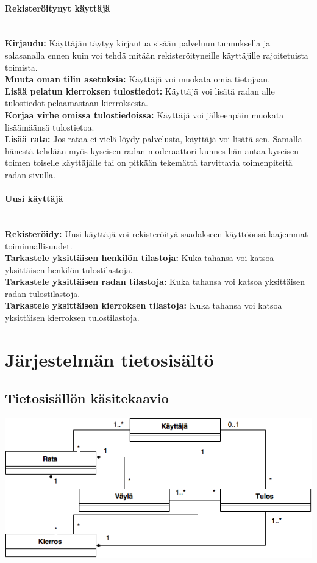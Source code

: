\documentclass[10pt,a4paper]{article}
\begin{document}
\paragraph{Rekisteröitynyt käyttäjä} \hspace{0pt}
\\\textbf{Kirjaudu:} Käyttäjän täytyy kirjautua sisään palveluun tunnuksella ja salasanalla ennen kuin voi tehdä mitään rekisteröityneille käyttäjille rajoitetuista toimista.
\\\textbf{Muuta oman tilin asetuksia:} Käyttäjä voi muokata omia tietojaan.
\\\textbf{Lisää pelatun kierroksen tulostiedot:} Käyttäjä voi lisätä radan alle tulostiedot pelaamastaan kierroksesta.
\\\textbf{Korjaa virhe omissa tulostiedoissa:} Käyttäjä voi jälkeenpäin muokata lisäämäänsä tulostietoa.
\\\textbf{Lisää rata:} Jos rataa ei vielä löydy palvelusta, käyttäjä voi lisätä sen. Samalla hänestä tehdään myös kyseisen radan moderaattori kunnes hän antaa kyseisen toimen toiselle käyttäjälle tai on pitkään tekemättä tarvittavia toimenpiteitä radan sivulla.
\paragraph{Uusi käyttäjä} \hspace{0pt}
\\\textbf{Rekisteröidy:} Uusi käyttäjä voi rekisteröityä saadakseen käyttöönsä laajemmat toiminnallisuudet.
\\\textbf{Tarkastele yksittäisen henkilön tilastoja:} Kuka tahansa voi katsoa yksittäisen henkilön tulostilastoja.
\\\textbf{Tarkastele yksittäisen radan tilastoja:} Kuka tahansa voi katsoa yksittäisen radan tulostilastoja.
\\\textbf{Tarkastele yksittäisen kierroksen tilastoja:} Kuka tahansa voi katsoa yksittäisen kierroksen tulostilastoja.


\newpage
\section{Järjestelmän tietosisältö}
\subsection{Tietosisällön käsitekaavio}
\includegraphics[scale=0.6]{tsoha_tietosisalto}
\end{document}
